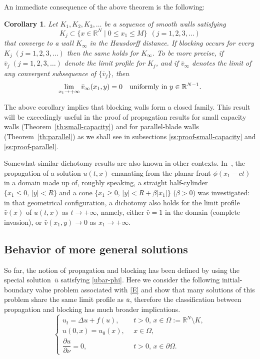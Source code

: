 \documentclass[a4paper,12pt,fullpage]{article}
\numberwithin{equation}{section}
\newtheorem{Cor}[Lemma]{Corollary}
\def\R{{\mathbb R}}
\begin{document}
An immediate consequence of the above theorem is the following:

\begin{Cor}\label{cor:blocking}
Let $K_1, K_2, K_3,\ldots$ be a sequence of smooth walls satisfying 
\[
K_j\subset\{x\in\R^N\mid 0\leq x_1\leq M\}\ \  (j=1,2,3,\ldots)
\]
that converge to a wall $K_\infty$ in the Hausdorff distance. If blocking occurs for every $K_j\;(j=1,2,3,\ldots)$ then the same
holds for $K_\infty$. 
To be more precise, if $\bar v_j\;(j=1,2,3,\ldots)$ denote the limit profile for $K_j$, and if $\bar v_\infty$ denotes the limit of any convergent subsequence of $\{\bar v_j\}$, then 
\[
\lim_{x_1\to +\infty} \bar{v}_\infty(x_1,y)=0\quad \hbox{uniformly in}\ y\in\R^{N-1}.
\]
\end{Cor}

The above corollary implies that blocking walls form a closed family. This result will be exceedingly useful in the proof of propagation results for small capacity walls (Theorem~\ref{th:small-capacity}) and for parallel-blade walls (Theorem~\ref{th:parallel}) as we shall see in subsections \ref{ss:proof-small-capacity} and \ref{ss:proof-parallel}.

Somewhat similar dichotomy results are also known in other contexts. In~\cite{HZ}, the propagation of a solution $u(t,x)$ emanating from the planar front $\phi(x_1-ct)$ in a domain made up of, roughly speaking, a straight half-cylinder $\{x_1\le0,\,|y|<R\}$ and a cone $\{x_1\ge0,\,|y|<R+\beta|x_1|\}$ ($\beta>0$) was investigated: in that geometrical configuration, a dichotomy also holds for the limit profile $\bar{v}(x)$ of $u(t,x)$ as $t\to+\infty$, namely, either $\bar{v}=1$ in the domain (complete invasion), or $\bar{v}(x_1,y)\to0$ as $x_1\to+\infty$.


\subsection{Behavior of more general solutions}\label{ss:general}

So far, the notion of propagation and blocking has been defined by using the special solution~$\bar{u}$ satisfying \eqref{ubar-phi}. Here we consider the following initial-boundary value problem associated with \eqref{E} and show that many solutions of this problem share the same limit profile as $\bar{u}$, therefore the classification between propagation and blocking has much broader implications.
\begin{equation}\label{E2}
\left\{
\begin{array}{ll}
u_t=\Delta u +f(u), \ \ & t>0,\,x\in \Omega:=\R^N\setminus K,\\[4pt]
u(0,x)=u_0(x), \ \ &x\in \Omega,\\[3pt]
\dfrac{\partial u}{\partial \nu} = 0, \ \ & t>0,\,x\in \partial\Omega.
\end{array}\right.
\end{equation}
\end{document}
